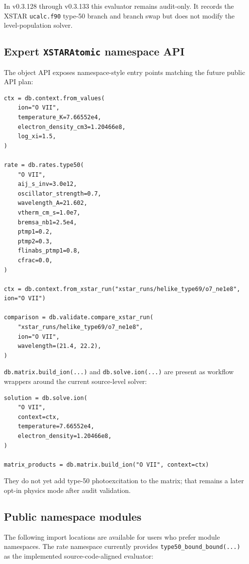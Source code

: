 \documentclass[11pt]{article}
\begin{document}
In v0.3.128 through v0.3.133 this evaluator remains audit-only. It records the XSTAR \texttt{ucalc.f90} type-50 branch and branch swap but does not modify the level-population solver.

\subsection{Expert \texttt{XSTARAtomic} namespace API}

The object API exposes namespace-style entry points matching the future public API plan:

\begin{lstlisting}[style=ctpython]
ctx = db.context.from_values(
    ion="O VII",
    temperature_K=7.66552e4,
    electron_density_cm3=1.20466e8,
    log_xi=1.5,
)

rate = db.rates.type50(
    "O VII",
    aij_s_inv=3.0e12,
    oscillator_strength=0.7,
    wavelength_A=21.602,
    vtherm_cm_s=1.0e7,
    bremsa_nb1=2.5e4,
    ptmp1=0.2,
    ptmp2=0.3,
    flinabs_ptmp1=0.8,
    cfrac=0.0,
)

ctx = db.context.from_xstar_run("xstar_runs/helike_type69/o7_ne1e8", ion="O VII")

comparison = db.validate.compare_xstar_run(
    "xstar_runs/helike_type69/o7_ne1e8",
    ion="O VII",
    wavelength=(21.4, 22.2),
)
\end{lstlisting}

\texttt{db.matrix.build\_ion(...)} and \texttt{db.solve.ion(...)} are present as workflow wrappers around the current source-level solver:

\begin{lstlisting}[style=ctpython]
solution = db.solve.ion(
    "O VII",
    context=ctx,
    temperature=7.66552e4,
    electron_density=1.20466e8,
)

matrix_products = db.matrix.build_ion("O VII", context=ctx)
\end{lstlisting}

They do not yet add type-50 photoexcitation to the matrix; that remains a later opt-in physics mode after audit validation.

\subsection{Public namespace modules}

The following import locations are available for users who prefer module namespaces. The rate namespace currently provides \texttt{type50\_bound\_bound(...)} as the implemented source-code-aligned evaluator:
\end{document}
